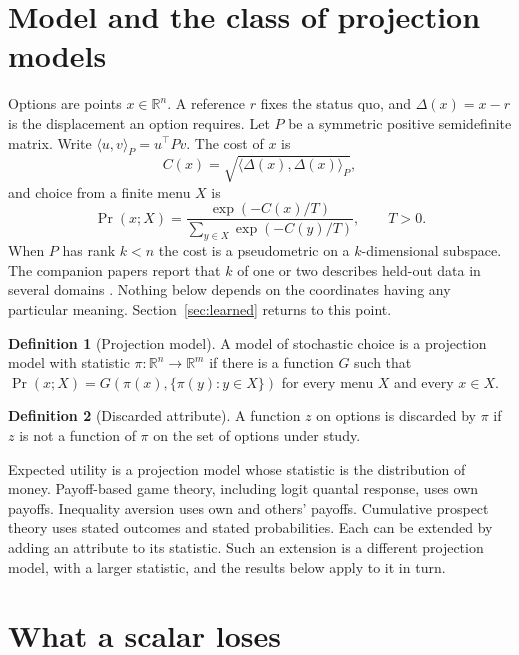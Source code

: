 \documentclass[11pt]{article}
\theoremstyle{definition}
\newtheorem{definition}{Definition}
\newcommand{\R}{\mathbb{R}}
\newcommand{\ip}[2]{\langle #1, #2\rangle_P}
\DeclareMathOperator{\Prob}{Pr}
\begin{document}
\section{Model and the class of projection models}\label{sec:model}

Options are points $x \in \R^n$.
A reference $r$ fixes the status quo, and $\Delta(x) = x - r$ is the displacement an option requires.
Let $P$ be a symmetric positive semidefinite matrix.
Write $\ip{u}{v} = u^\top P v$.
The cost of $x$ is
\begin{equation}\label{eq:cost}
C(x) = \sqrt{\ip{\Delta(x)}{\Delta(x)}},
\end{equation}
and choice from a finite menu $X$ is
\begin{equation}\label{eq:logit}
\Prob(x; X) = \frac{\exp(-C(x)/T)}{\sum_{y \in X} \exp(-C(y)/T)}, \qquad T > 0.
\end{equation}
When $P$ has rank $k < n$ the cost is a pseudometric on a $k$-dimensional subspace.
The companion papers report that $k$ of one or two describes held-out data in several domains \citep{BondPartII}.
Nothing below depends on the coordinates having any particular meaning.
Section~\ref{sec:learned} returns to this point.

\begin{definition}[Projection model]
A model of stochastic choice is a projection model with statistic $\pi : \R^n \to \R^m$ if there is a function $G$ such that $\Prob(x; X) = G(\pi(x), \{\pi(y) : y \in X\})$ for every menu $X$ and every $x \in X$.
\end{definition}

\begin{definition}[Discarded attribute]
A function $z$ on options is discarded by $\pi$ if $z$ is not a function of $\pi$ on the set of options under study.
\end{definition}

Expected utility is a projection model whose statistic is the distribution of money.
Payoff-based game theory, including logit quantal response, uses own payoffs.
Inequality aversion \citep{FehrSchmidt1999} uses own and others' payoffs.
Cumulative prospect theory \citep{TverskyKahneman1992} uses stated outcomes and stated probabilities.
Each can be extended by adding an attribute to its statistic.
Such an extension is a different projection model, with a larger statistic, and the results below apply to it in turn.

\section{What a scalar loses}\label{sec:scalar}
\end{document}
